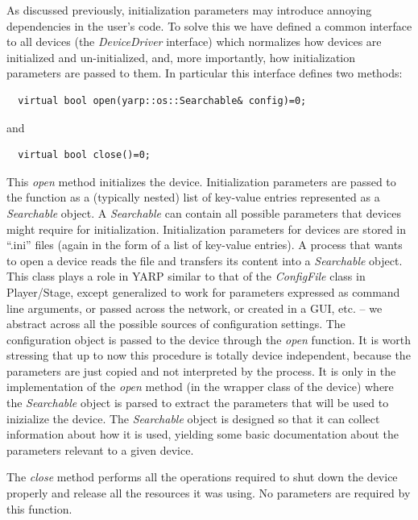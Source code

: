 As discussed previously, initialization parameters may introduce annoying 
dependencies in the user's code. To solve this we have defined a common 
interface to all devices (the 
\emph{DeviceDriver} interface) which normalizes how devices are initialized
and un-initialized, and, more importantly, how initialization parameters 
are passed to them. In particular this interface defines two methods:
\begin{verbatim}
  virtual bool open(yarp::os::Searchable& config)=0;
\end{verbatim}
and
\begin{verbatim}
  virtual bool close()=0;
\end{verbatim}
This \emph{open} method initializes the device. Initialization parameters 
are passed to the function as a (typically nested) list of key-value entries 
represented as a \emph{Searchable} object.
A \emph{Searchable} can contain all 
possible parameters that devices might require for initialization. Initialization 
parameters for devices 
are stored in ``.ini'' files (again in the form of a list of key-value 
entries).
A process that wants to open a device reads 
the file and transfers its content into a \emph{Searchable} object. 
This class
plays a role in YARP similar to that of the {\em ConfigFile} class in Player/Stage,
except generalized to work for
 parameters expressed as command line arguments, or
passed across the network, or created in a GUI, etc. -- we abstract
across all the possible sources of configuration settings.
The configuration
object is passed to the device through the \emph{open} function. 
It is worth stressing that up to now this procedure is totally device 
independent, because the parameters are just copied and not interpreted 
by the process. It is only in the implementation of the \emph{open} method 
(in the wrapper class of the device) where the \emph{Searchable} object 
is parsed to extract the parameters that will be used to inizialize the 
device.  The \emph{Searchable} object is designed so that it can
collect information about how it is used, yielding some basic
documentation about the parameters relevant to a given device.

The \emph{close} method performs all the operations required to shut down 
the device properly and release all the resources it was using. No
parameters are required by this function.

